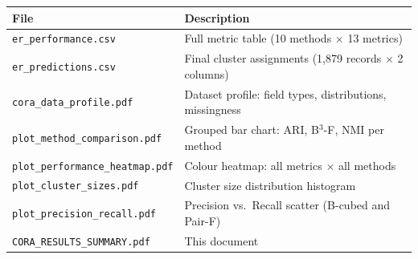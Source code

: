 \documentclass[11pt, a4paper]{article}
\begin{document}
\begin{table}[h!]
\centering
\begin{tabular}{ll}
\toprule
\textbf{File} & \textbf{Description} \\
\midrule
\texttt{er\_performance.csv}        & Full metric table (10 methods $\times$ 13 metrics) \\
\texttt{er\_predictions.csv}        & Final cluster assignments (1,879 records $\times$ 2 columns) \\
\texttt{cora\_data\_profile.pdf}    & Dataset profile: field types, distributions, missingness \\
\texttt{plot\_method\_comparison.pdf} & Grouped bar chart: ARI, B$^3$-F, NMI per method \\
\texttt{plot\_performance\_heatmap.pdf} & Colour heatmap: all metrics $\times$ all methods \\
\texttt{plot\_cluster\_sizes.pdf}   & Cluster size distribution histogram \\
\texttt{plot\_precision\_recall.pdf} & Precision vs.\ Recall scatter (B-cubed and Pair-F) \\
\texttt{CORA\_RESULTS\_SUMMARY.pdf} & This document \\
\bottomrule
\end{tabular}
\end{table}
\end{document}
